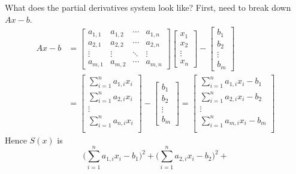 \documentclass{article}
\begin{document}
\begin{enumerate}
  What does the partial derivatives system look like? First, need to break down $Ax - b$.
  {
  \everymath{\displaystyle}
  \begin{align*}  
    Ax-b &= 
    \begin{bmatrix}
        a_{1,1} & a_{1,2} & \cdots & a_{1,n} \\
        a_{2,1} & a_{2,2} & \cdots & a_{2,n} \\
        \vdots  & \vdots  & \ddots & \vdots  \\
        a_{m,1} & a_{m,2} & \cdots & a_{m,n} 
    \end{bmatrix}
    \begin{bmatrix}
        x_{1} \\
        x_{2} \\
        \vdots \\
        x_{n}
    \end{bmatrix}
     - 
    \begin{bmatrix}
        b_{1} \\
        b_{2} \\
        \vdots \\
        b_{m}
    \end{bmatrix} \\
    &= 
    \begin{bmatrix}
        \sum_{i=1}^n a_{1,i} x_{i} \\
        \sum_{i=1}^n a_{2,i} x_{i} \\
        \vdots \\
        \sum_{i=1}^n a_{n,i} x_{i} \\
    \end{bmatrix}
     - 
    \begin{bmatrix}
        b_{1} \\
        b_{2} \\
        \vdots \\
        b_{m}
    \end{bmatrix} 
    = 
    \begin{bmatrix}
        \sum_{i=1}^n a_{1,i} x_{i} - b_1 \\
        \sum_{i=1}^n a_{2,i} x_{i} - b_2\\
        \vdots \\
        \sum_{i=1}^n a_{m,i} x_{i} - b_m\\
    \end{bmatrix}
  \end{align*}
  Hence $S(x)$ is 
    \[  \Big(\sum_{i=1}^n a_{1,i} x_{i} - b_1 \Big)^2 +
        \Big(\sum_{i=1}^n a_{2,i} x_{i} - b_2 \Big)^2 +
\]}
\end{enumerate}
\end{document}

